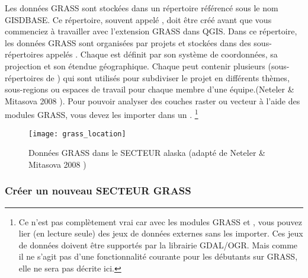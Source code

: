 Les données GRASS sont stockées dans un répertoire référencé sous le nom GISDBASE. Ce répertoire, souvent appelé , doit être créé avant que vous commenciez à travailler avec l'extension GRASS dans QGIS. Dans ce répertoire, les données GRASS sont organisées par projets et stockées dans des sous-répertoires appelés . Chaque  est définit par son système de coordonnées, sa projection et son étendue géographique. Chaque  peut contenir plusieurs  (sous-répertoires de ) qui sont utilisés pour subdiviser le projet en différents thèmes, sous-regions ou espaces de travail pour chaque membre d'une équipe.(Neteler \& Mitasova 2008 \cite{neteler_mitasova08}). Pour pouvoir analyser des couches raster ou vecteur à l'aide des modules GRASS, vous devez les importer dans un . \footnote {Ce n'est pas complètement vrai car avec les modules GRASS  et , vous pouvez lier (en lecture seule) des jeux de données externes sans les importer. Ces jeux de données doivent être supportés par la librairie GDAL/OGR. Mais comme il ne s'agit pas d'une fonctionnalité courante pour les débutants sur GRASS, elle ne sera pas décrite ici.}

\begin{figure}[ht]
\begin{center}
\caption{Données GRASS dans le SECTEUR alaska (adapté de Neteler \& Mitasova 2008 \cite{neteler_mitasova08})}\label{fig:grass_location}\smallskip
\texttt{[image: grass\_location]}
\end{center}  
\end{figure}

\subsubsection{Créer un nouveau SECTEUR GRASS}\label{sec:create_loc}


